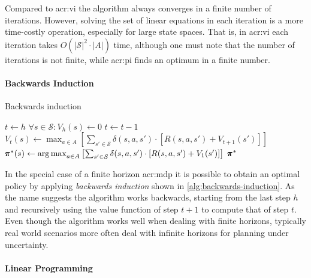 Compared to \acrshort{acr:vi} the algorithm always converges in a finite number of iterations. However, solving the set of linear equations in each iteration is a more time-costly operation, especially for large state spaces.
That is, in \acrshort{acr:vi} each iteration takes $O(\lvert\mathcal{S}\rvert^2\cdot\lvert A\rvert)$ time, although one must note that the number of iterations is not finite, while \acrshort{acr:pi} finds an optimum in a finite number.

\paragraph{Backwards Induction}
\label{sec:backwards-induction}

\begin{algorithm}[!t]
	\caption{Backwards induction}
	\label{alg:backwards-induction}
	\begin{algorithmic}[1]
		\State $t \gets h$
		\State $\forall s \in \mathcal{S}: V_h(s) \gets 0$
		\Repeat
		\State $t \gets t - 1$
		\State $V_t(s) \gets \max_{a \in A} \left[\sum_{s' \in \mathcal{S}} \delta(s,a,s') \cdot \left[R(s,a,s') + V_{t+1}(s')\right]\right]$
		\EndFor
		\State $\pmb{\pi}^*(s) \gets \operatorname*{arg\,max}_{a \in A} \left[\sum_{s' \in \mathcal{S}} \delta(s,a,s') \cdot \left[R(s,a,s') + V_{1}(s')\right]\right]$
		\EndFor
		\State\Return $\pmb{\pi}^*$
	\end{algorithmic}
\end{algorithm}

In the special case of a finite horizon \acrshort{acr:mdp} it is possible to obtain an optimal policy by applying \textit{backwards induction} \cite{chamie2015finite} shown in \autoref{alg:backwards-induction}.
As the name suggests the algorithm works backwards, starting from the last step $h$ and recursively using the value function of step $t + 1$ to compute that of step $t$.
Even though the algorithm works well when dealing with finite horizons, typically real world scenarios more often deal with infinite horizons for planning under uncertainty.

\paragraph{Linear Programming}
\label{sec:linear-programming}

